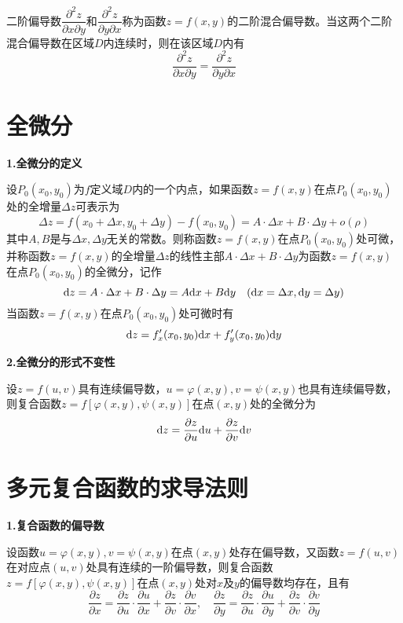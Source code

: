 二阶偏导数$\dfrac{\partial^2 z}{\partial x\partial y}$和$\dfrac{\partial^2 z}{\partial y\partial x}$称为函数$z=f(x,y)$的二阶混合偏导数。当这两个二阶混合偏导数在区域$D$内连续时，则在该区域$D$内有
\begin{equation*}
    \dfrac{\partial^2 z}{\partial x\partial y}=\dfrac{\partial^2 z}{\partial y\partial x}
\end{equation*}

\section{全微分}
\textbf{1.全微分的定义}

设$P_0(x_0,y_0)$为$f$定义域$D$内的一个内点，如果函数$z=f(x,y)$在点$P_0(x_0,y_0)$处的全增量$\Delta z$可表示为
\begin{equation*}
    \Delta z=f(x_0+\Delta x,y_0+\Delta y)-f(x_0,y_0)=A\cdot\Delta x+B\cdot\Delta y+o(\rho)
\end{equation*}
其中$A, B$是与$\Delta x, \Delta y$无关的常数。则称函数$z=f(x,y)$在点$P_0(x_0,y_0)$处可微，并称函数$z=f(x,y)$的全增量$\Delta z$的线性主部$A\cdot\Delta x+B\cdot\Delta y$为函数$z=f(x,y)$在点$P_0(x_0,y_0)$的全微分，记作
\begin{equation*}
    \mathrm{d} z=A\cdot\Delta x+B\cdot\Delta y=A\mathrm{d} x+B\mathrm{d} y \quad (\mathrm{d} x=\Delta x, \mathrm{d} y=\Delta y)
\end{equation*}
当函数$z=f(x,y)$在点$P_0(x_0,y_0)$处可微时有
\begin{equation*}
    \mathrm{d} z=f_x'(x_0,y_0)\mathrm{d} x+f_y'(x_0,y_0)\mathrm{d} y
\end{equation*}

\textbf{2.全微分的形式不变性}

设$z=f(u,v)$具有连续偏导数，$u=\varphi(x,y),v=\psi(x,y)$也具有连续偏导数，则复合函数$z=f[\varphi(x,y),\psi(x,y)]$在点$(x,y)$处的全微分为
\begin{equation*}
    \mathrm{d} z=\dfrac{\partial z}{\partial u}\mathrm{d} u+\dfrac{\partial z}{\partial v}\mathrm{d} v
\end{equation*}

\section{多元复合函数的求导法则}
\textbf{1.复合函数的偏导数}

设函数$u=\varphi(x,y),v=\psi(x,y)$在点$(x,y)$处存在偏导数，又函数$z=f(u,v)$在对应点$(u,v)$处具有连续的一阶偏导数，则复合函数$z=f[\varphi(x,y),\psi(x,y)]$在点$(x,y)$处对$x$及$y$的偏导数均存在，且有
\begin{equation*}
    \dfrac{\partial z}{\partial x}=\dfrac{\partial z}{\partial u}\cdot\dfrac{\partial u}{\partial x}+\dfrac{\partial z}{\partial v}\cdot\dfrac{\partial v}{\partial x}, \quad
    \dfrac{\partial z}{\partial y}=\dfrac{\partial z}{\partial u}\cdot\dfrac{\partial u}{\partial y}+\dfrac{\partial z}{\partial v}\cdot\dfrac{\partial v}{\partial y}
\end{equation*}

